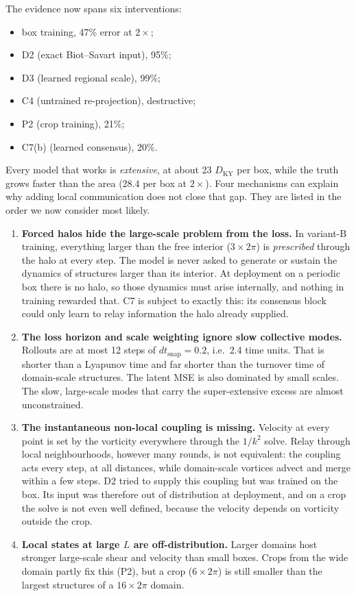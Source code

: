 \documentclass[11pt]{article}
\begin{document}
The evidence now spans six interventions:
\begin{itemize}[leftmargin=*]
\item box training, 47\% error at $2\times$;
\item D2 (exact Biot--Savart input), 95\%;
\item D3 (learned regional scale), 99\%;
\item C4 (untrained re-projection), destructive;
\item P2 (crop training), 21\%;
\item C7(b) (learned consensus), 20\%.
\end{itemize}
Every model that works is \emph{extensive}, at about 23 $D_{\mathrm{KY}}$
per box, while the truth grows faster than the area (28.4 per box at
$2\times$). Four mechanisms can explain why adding local communication
does not close that gap. They are listed in the order we now consider
most likely.

\begin{enumerate}[label=(\alph*),leftmargin=*]
\item \textbf{Forced halos hide the large-scale problem from the loss.}
  In variant-B training, everything larger than the free interior
  ($3\times2\pi$) is \emph{prescribed} through the halo at every step. The
  model is never asked to generate or sustain the dynamics of structures
  larger than its interior. At deployment on a periodic box there is no
  halo, so those dynamics must arise internally, and nothing in training
  rewarded that. C7 is subject to exactly this: its consensus block could
  only learn to relay information the halo already supplied.
\item \textbf{The loss horizon and scale weighting ignore slow collective
  modes.} Rollouts are at most 12 steps of $dt_{\mathrm{snap}}{=}0.2$,
  i.e.\ 2.4 time units. That is shorter than a Lyapunov time and far
  shorter than the turnover time of domain-scale structures. The latent
  MSE is also dominated by small scales. The slow, large-scale modes that
  carry the super-extensive excess are almost unconstrained.
\item \textbf{The instantaneous non-local coupling is missing.} Velocity
  at every point is set by the vorticity everywhere through the $1/k^2$
  solve. Relay through local neighbourhoods, however many rounds, is not
  equivalent: the coupling acts every step, at all distances, while
  domain-scale vortices advect and merge within a few steps. D2 tried to
  supply this coupling but was trained on the box. Its input was
  therefore out of distribution at deployment, and on a crop the solve
  is not even well defined, because the velocity depends on vorticity
  outside the crop.
\item \textbf{Local states at large $L$ are off-distribution.} Larger
  domains host stronger large-scale shear and velocity than small boxes.
  Crops from the wide domain partly fix this (P2), but a crop
  ($6\times2\pi$) is still smaller than the largest structures of a
  $16\times2\pi$ domain.
\end{enumerate}
\end{document}
